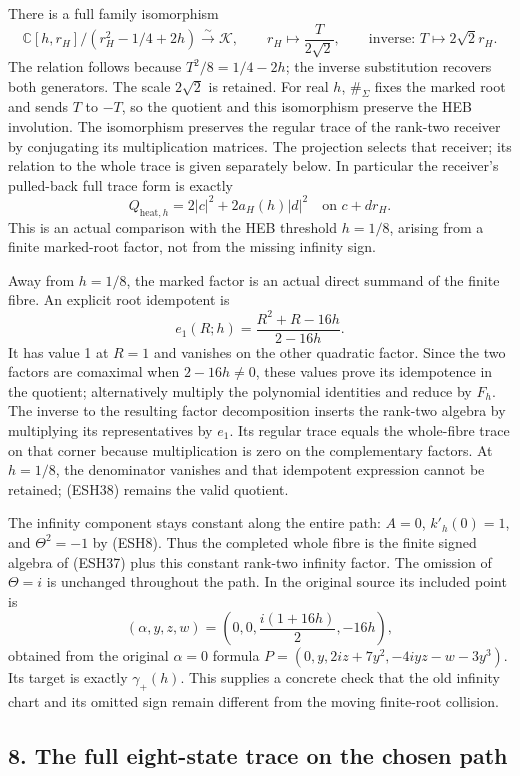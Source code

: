 \documentclass[
  10pt,
  a4paper,
]{article}
\begin{document}
There is a full family isomorphism \[
\mathbb C[h,r_H]/(r_H^2-1/4+2h)
\xrightarrow{\sim}\mathcal K,
\qquad r_H\longmapsto\frac{T}{2\sqrt2},
\qquad\text{inverse: }T\longmapsto2\sqrt2r_H.
\tag{ESH39}
\] The relation follows because \(T^2/8=1/4-2h\); the inverse
substitution recovers both generators. The scale \(2\sqrt2\) is
retained. For real \(h\), \(\#_\Sigma\) fixes the marked root and sends
\(T\) to \(-T\), so the quotient and this isomorphism preserve the HEB
involution. The isomorphism preserves the regular trace of the rank-two
receiver by conjugating its multiplication matrices. The projection
selects that receiver; its relation to the whole trace is given
separately below. In particular the receiver's pulled-back full trace
form is exactly \[
Q_{\mathrm{heat},h}=2|c|^2+2a_H(h)|d|^2
\quad\text{on }c+dr_H.
\tag{ESH40}
\] This is an actual comparison with the HEB threshold \(h=1/8\),
arising from a finite marked-root factor, not from the missing infinity
sign.

Away from \(h=1/8\), the marked factor is an actual direct summand of
the finite fibre. An explicit root idempotent is \[
e_1(R;h)=\frac{R^2+R-16h}{2-16h}.
\tag{ESH41}
\] It has value 1 at \(R=1\) and vanishes on the other quadratic factor.
Since the two factors are comaximal when \(2-16h\ne0\), these values
prove its idempotence in the quotient; alternatively multiply the
polynomial identities and reduce by \(F_h\). The inverse to the
resulting factor decomposition inserts the rank-two algebra by
multiplying its representatives by \(e_1\). Its regular trace equals the
whole-fibre trace on that corner because multiplication is zero on the
complementary factors. At \(h=1/8\), the denominator vanishes and that
idempotent expression cannot be retained; (ESH38) remains the valid
quotient.

The infinity component stays constant along the entire path: \(A=0\),
\(k'_h(0)=1\), and \(\Theta^2=-1\) by (ESH8). Thus the completed whole
fibre is the finite signed algebra of (ESH37) plus this constant
rank-two infinity factor. The omission of \(\Theta=i\) is unchanged
throughout the path. In the original source its included point is \[
(\alpha,y,z,w)=\left(0,0,\frac{i(1+16h)}2,-16h\right),
\tag{ESH42}
\] obtained from the original \(\alpha=0\) formula
\(P=(0,y,2iz+7y^2,-4iyz-w-3y^3)\). Its target is exactly
\(\gamma_+(h)\). This supplies a concrete check that the old infinity
chart and its omitted sign remain different from the moving finite-root
collision.

\subsection{8. The full eight-state trace on the chosen
path}\label{the-full-eight-state-trace-on-the-chosen-path}
\end{document}
